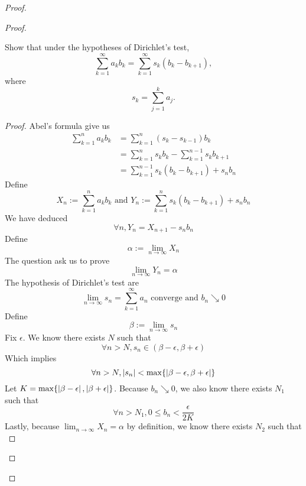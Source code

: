 \documentclass{report}
\begin{document}
\begin{proof}
\begin{proof}
\begin{question}{}{}
Show that under the hypotheses of Dirichlet’s test,
\[
\sum_{k=1}^{\infty} a_k b_k = \sum_{k=1}^{\infty} s_k (b_k - b_{k+1}),
\]
where 
\[
s_k = \sum_{j=1}^{k} a_j.
\]
\end{question}
\begin{proof}
Abel's formula give us
\begin{align}
\sum_{k=1}^na_kb_k&=\sum_{k=1}^n (s_{k}-s_{k-1})b_k\\
&=\sum_{k=1}^n s_kb_k-\sum_{k=1}^{n-1} s_kb_{k+1}\\
&=\sum_{k=1}^{n-1}s_k(b_k-b_{k+1})+s_nb_n
\end{align}
Define 
\begin{equation}
X_n:=\sum_{k=1}^n a_kb_k\text{ and }Y_n:=\sum_{k=1}^{n}s_k(b_k-b_{k+1})+s_nb_n
\end{equation}
We have deduced
\begin{equation}
\forall n,Y_n=X_{n+1}-s_nb_n
\end{equation}
Define
\begin{equation}
\alpha :=\lim_{n\to\infty}X_n 
\end{equation}
The question ask us to prove
\begin{equation}
\lim_{n\to\infty}Y_n=\alpha 
\end{equation}
The hypothesis of Dirichlet's test are 
\begin{equation}
 \lim_{n\to\infty}s_n=\sum_{k=1}^\infty a_n\text{ converge and }b_n\searrow 0
\end{equation}
Define 
\begin{equation}
\beta :=\lim_{n\to\infty}s_n
\end{equation}
Fix $\epsilon $. We know there exists $N$ such that 
 \begin{equation}
\forall n>N, s_n\in (\beta - \epsilon ,\beta +\epsilon )
\end{equation}
Which implies 
\begin{equation}
\forall n>N, \left|s_n\right|<\max \{ \left|\beta -\epsilon ,\beta +\epsilon \right| \}
\end{equation}
Let $K=\max \{ \left|\beta -\epsilon \right|,\left|\beta +\epsilon \right| \}$. Because $b_n\searrow 0$, we also know there exists $N_1$ such that
 \begin{equation}
   \forall n>N_1, 0\leq b_n<\frac{\epsilon }{2K}
\end{equation}
Lastly, because $\lim_{n\to\infty}X_n=\alpha $ by definition, we know there exists $N_2$ such that 
\begin{equation}

\end{equation}
\end{proof}
\end{proof}
\end{proof}
\end{document}
